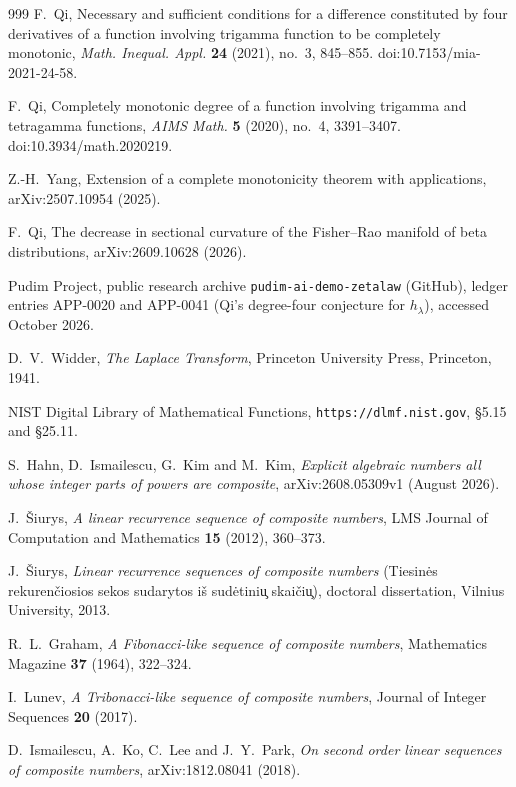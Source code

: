 \documentclass[11pt]{amsart}
\theoremstyle{definition}
\theoremstyle{remark}
\begin{document}
\begin{thebibliography}{999}
F.~Qi, Necessary and sufficient conditions for a difference constituted by four derivatives of
a function involving trigamma function to be completely monotonic, \emph{Math. Inequal. Appl.}
\textbf{24} (2021), no.~3, 845--855. doi:10.7153/mia-2021-24-58.

F.~Qi, Completely monotonic degree of a function involving trigamma and tetragamma functions,
\emph{AIMS Math.} \textbf{5} (2020), no.~4, 3391--3407. doi:10.3934/math.2020219.

Z.-H.~Yang, Extension of a complete monotonicity theorem with applications,
arXiv:2507.10954 (2025).

F.~Qi, The decrease in sectional curvature of the Fisher--Rao manifold of beta distributions,
arXiv:2609.10628 (2026).

Pudim Project, public research archive \texttt{pudim-ai-demo-zetalaw} (GitHub), ledger entries
APP-0020 and APP-0041 (Qi's degree-four conjecture for $h_\lambda$), accessed October 2026.

D.~V.~Widder, \emph{The Laplace Transform}, Princeton University Press, Princeton, 1941.

NIST Digital Library of Mathematical Functions, \texttt{https://dlmf.nist.gov}, \S5.15 and \S25.11.

S.~Hahn, D.~Ismailescu, G.~Kim and M.~Kim,
\emph{Explicit algebraic numbers all whose integer parts of powers are composite},
arXiv:2608.05309v1 (August 2026).

J.~\v{S}iurys,
\emph{A linear recurrence sequence of composite numbers},
LMS Journal of Computation and Mathematics \textbf{15} (2012), 360--373.

J.~\v{S}iurys,
\emph{Linear recurrence sequences of composite numbers} (Tiesin\.es rekurenčiosios sekos sudarytos i\v{s} sud\.etini\c{u} skai\v{c}i\c{u}),
doctoral dissertation, Vilnius University, 2013.

R.~L.~Graham,
\emph{A Fibonacci-like sequence of composite numbers},
Mathematics Magazine \textbf{37} (1964), 322--324.

I.~Lunev,
\emph{A Tribonacci-like sequence of composite numbers},
Journal of Integer Sequences \textbf{20} (2017).

D.~Ismailescu, A.~Ko, C.~Lee and J.~Y.~Park,
\emph{On second order linear sequences of composite numbers},
arXiv:1812.08041 (2018).


\end{thebibliography}
\end{document}
